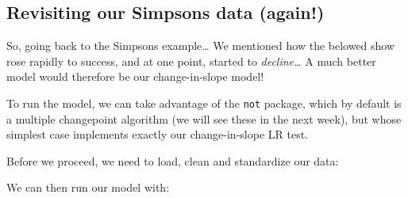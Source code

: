 \documentclass[
  letterpaper,
  DIV=11,
  numbers=noendperiod]{scrreprt}
\newenvironment{Shaded}{\begin{snugshade}}{\end{snugshade}}
\newcommand{\AttributeTok}[1]{\textcolor[rgb]{0.40,0.45,0.13}{#1}}
\newcommand{\CommentTok}[1]{\textcolor[rgb]{0.37,0.37,0.37}{#1}}
\newcommand{\ConstantTok}[1]{\textcolor[rgb]{0.56,0.35,0.01}{#1}}
\newcommand{\DecValTok}[1]{\textcolor[rgb]{0.68,0.00,0.00}{#1}}
\newcommand{\FunctionTok}[1]{\textcolor[rgb]{0.28,0.35,0.67}{#1}}
\newcommand{\NormalTok}[1]{\textcolor[rgb]{0.00,0.23,0.31}{#1}}
\newcommand{\OtherTok}[1]{\textcolor[rgb]{0.00,0.23,0.31}{#1}}
\newcommand{\SpecialCharTok}[1]{\textcolor[rgb]{0.37,0.37,0.37}{#1}}
\newcommand{\StringTok}[1]{\textcolor[rgb]{0.13,0.47,0.30}{#1}}
\begin{document}
\subsection{Revisiting our Simpsons data
(again!)}\label{revisiting-our-simpsons-data-again}

So, going back to the Simpsons example\ldots{} We mentioned how the
belowed show rose rapidly to success, and at one point, started to
\emph{decline\ldots{}} A much better model would therefore be our
change-in-slope model!

To run the model, we can take advantage of the \texttt{not} package,
which by default is a multiple changepoint algorithm (we will see these
in the next week), but whose simplest case implements exactly our
change-in-slope LR test.

Before we proceed, we need to load, clean and standardize our data:

\begin{Shaded}
\end{Shaded}

We can then run our model with:

\begin{Shaded}
\end{Shaded}
\end{document}
